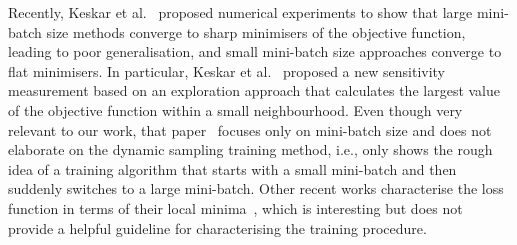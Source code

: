 \documentclass[10pt,journal,compsoc]{IEEEtran}
\begin{document}
Recently, Keskar et al.~\cite{keskar2016large} proposed numerical experiments to show that large mini-batch size methods converge to sharp minimisers of the objective function, leading to poor generalisation, and small mini-batch size approaches converge to flat minimisers. 
In particular, Keskar et al.~\cite{keskar2016large} proposed a new sensitivity measurement based on an exploration approach that calculates the largest value of the objective function within a small neighbourhood.  
Even though very relevant to our work, that paper~\cite{keskar2016large} focuses only on mini-batch size and does not elaborate on the dynamic sampling training method, i.e., only shows the rough idea of a training algorithm that starts with a small mini-batch and then suddenly switches to a large mini-batch.
Other recent works characterise the loss function in terms of their local minima~\cite{littwin2016loss,soudry2016no,lee2016gradient}, which is interesting but does not provide a helpful guideline for characterising the training procedure.
\end{document}
